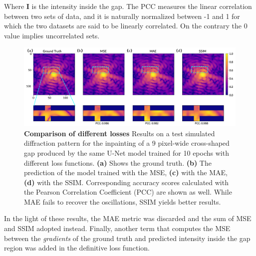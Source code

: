 Where \textbf{I} is the intensity inside the gap. The PCC measures the linear correlation between two sets of data, 
and it is naturally normalized between -1 and 1 for which the two datasets are said to be linearly correlated. On the 
contrary the 0 value implies uncorrelated sets. 

\begin{figure}[h]
    \includegraphics[width=\textwidth]{figures/Inpainting/loss_comparison.pdf}
    \caption{\textbf{Comparison of different losses} Results on a test simulated diffraction pattern for the inpainting 
    of a 9 pixel-wide cross-shaped gap produced by the same U-Net model trained for 10 epochs with different loss functions. 
    \textbf{(a)} Shows the ground truth. \textbf{(b)} The prediction of the model trained with the MSE, \textbf{(c)} 
    with the MAE, \textbf{(d)} with the SSIM. Corresponding accuracy scores calculated with the Pearson Correlation 
    Coefficient (PCC) are shown as well. While MAE fails to recover the oscillations, SSIM yields better results.}
    \label{fig:loss_comparison_inpainting}
\end{figure}

In the light of these results, the MAE metric was discarded and the sum of MSE and SSIM adopted instead. 
Finally, another term that computes the MSE between the \textit{gradients} of the ground truth and predicted intensity inside
the gap region was added in the definitive loss function.\\

